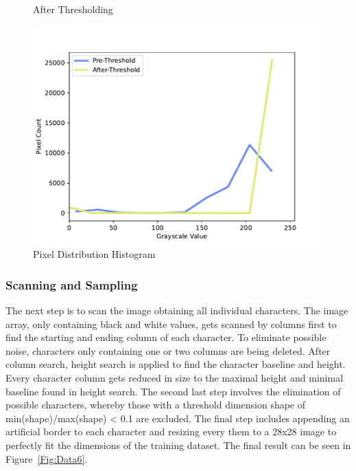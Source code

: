 \documentclass[@CLASSOPTIONS@]{tumarticle}
\begin{document}
\begin{figure}[!htb]
   \begin{minipage}{0.48\textwidth}
     \centering
     \caption{After Thresholding}\label{Fig:Data4}
   \end{minipage}
  \hfill
   \begin{minipage}{0.48\textwidth}
     \centering
     \includegraphics[width=.9\linewidth]{figures/histogram}
     \caption{Pixel Distribution Histogram}\label{Fig:Data5}
   \end{minipage}
\end{figure}

\subsubsection{Scanning and Sampling}

The next step is to scan the image obtaining all individual characters.
The image array, only containing black and white values, gets scanned by columns first to find the starting
and ending column of each character.
To eliminate possible noise, characters only containing one or two columns are being deleted.
After column search, height search is applied to find the character baseline and height.
Every character column gets reduced in size to the maximal height and minimal baseline found in height search.
The second last step involves the elimination of possible characters, whereby those with a threshold
dimension shape of min(shape)/max(shape) < 0.1 are excluded.
The final step includes appending an artificial border to each character and resizing every them to a 28x28 image to
perfectly fit the dimensions of the training dataset.
The final result can be seen in Figure~\ref{Fig:Data6}.
\end{document}
